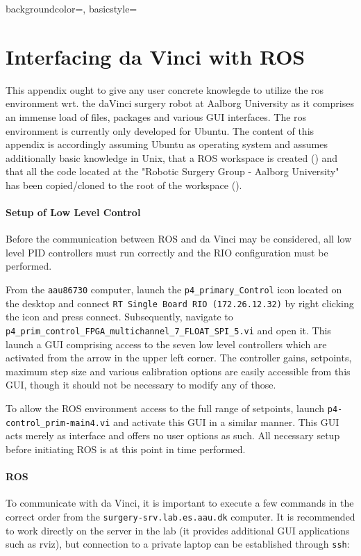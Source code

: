 {
    backgroundcolor=\color{black},
    basicstyle=\scriptsize\color{green}%
}
%
\chapter{Interfacing da Vinci with ROS}\label{app:ros}
This appendix ought to give any user concrete knowlegde to utilize the \gls{ros} environment wrt. the \gls{daVinci} surgery robot at Aalborg University as it comprises an immense load of files, packages and various GUI interfaces. The \gls{ros} environment is currently only developed for Ubuntu. The content of this appendix is accordingly assuming Ubuntu as operating system and assumes additionally basic knowledge in Unix, that a ROS workspace is created ({}) and that all the code located at the "Robotic Surgery Group - Aalborg University" has been copied/cloned to the root of the workspace ({}).
\subsubsection*{Setup of Low Level Control}
Before the communication between ROS and da Vinci may be considered, all low level PID controllers must run correctly and the RIO configuration must be performed. 

From the \texttt{aau86730} computer, launch the \texttt{p4\_primary\_Control} icon located on the desktop and connect \texttt{RT Single Board RIO (172.26.12.32)} by right clicking the icon and press connect. Subsequently, navigate to \texttt{p4\_prim\_control\_FPGA\_multichannel\_7\_FLOAT\_SPI\_5.vi} and open it. This launch a GUI comprising access to the seven low level controllers which are activated from the arrow in the upper left corner. The controller gains, setpoints, maximum step size and various calibration options are easily accessible from this GUI, though it should not be necessary to modify any of those. 

To allow the ROS environment access to the full range of setpoints, launch \texttt{p4-control\_prim-main4.vi} and activate this GUI in a similar manner. This GUI acts merely as interface and offers no user options as such. All necessary setup before initiating ROS is at this point in time performed.
\subsubsection*{ROS}
To communicate with da Vinci, it is important to execute a few commands in the correct order from the \texttt{surgery-srv.lab.es.aau.dk} computer. It is recommended to work directly on the server in the lab (it provides additional GUI applications such as rviz), but connection to a private laptop can be established through \texttt{ssh}:

